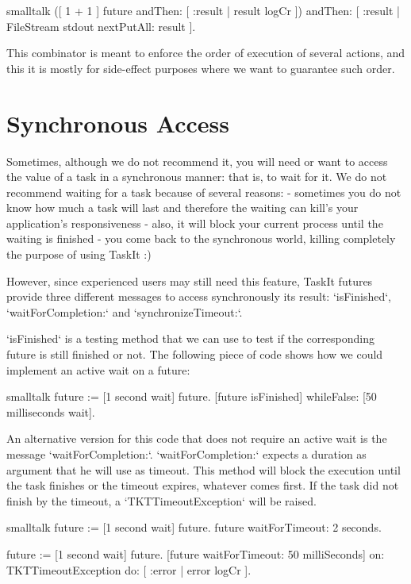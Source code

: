 \documentclass[10pt,twoside,english]{_support/latex/sbabook/sbabook}
\begin{document}
\begin{displaycode}{smalltalk}
([ 1 + 1 ] future
    andThen: [ :result | result logCr ])
    andThen: [ :result | FileStream stdout nextPutAll: result ]. 
\end{displaycode}

This combinator is meant to enforce the order of execution of several actions, and this it is mostly for side-effect purposes where we want to guarantee such order.
\section{Synchronous Access}
Sometimes, although we do not recommend it, you will need or want to access the value of a task in a synchronous manner: that is, to wait for it. We do not recommend waiting for a task because of several reasons:
  - sometimes you do not know how much a task will last and therefore the waiting can kill's your application's responsiveness
  - also, it will block your current process until the waiting is finished
  - you come back to the synchronous world, killing completely the purpose of using TaskIt :)

However, since experienced users may still need this feature, TaskIt futures provide three different messages to access synchronously its result: `isFinished`, `waitForCompletion:` and `synchronizeTimeout:`.

`isFinished` is a testing method that we can use to test if the corresponding future is still finished or not. The following piece of code shows how we could implement an active wait on a future:

\begin{displaycode}{smalltalk}
future := [1 second wait] future.
[future isFinished] whileFalse: [50 milliseconds wait].
\end{displaycode}

An alternative version for this code that does not require an active wait is the message `waitForCompletion:`. `waitForCompletion:` expects a duration as argument that he will use as timeout. This method will block the execution until the task finishes or the timeout expires, whatever comes first. If the task did not finish by the timeout, a `TKTTimeoutException` will be raised.

\begin{displaycode}{smalltalk}
future := [1 second wait] future.
future waitForTimeout: 2 seconds.

future := [1 second wait] future.
[future waitForTimeout: 50 milliSeconds] on: TKTTimeoutException do: [ :error | error logCr ].
\end{displaycode}
\end{document}
